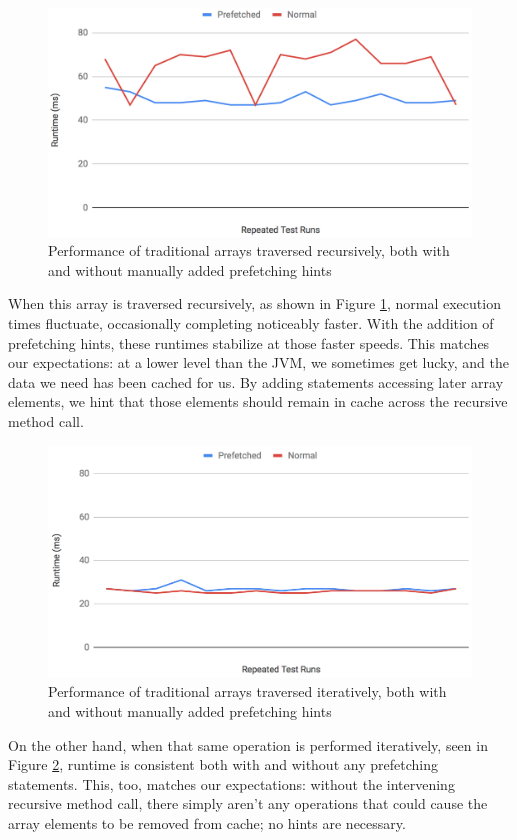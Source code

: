 \documentclass[journal]{IEEEtran}
\begin{document}
\begin{figure}[t]
    \includegraphics[width=0.9\linewidth]{arrayRecursive.png}
    \caption{\small Performance of traditional arrays traversed recursively, both with and without manually added prefetching hints}
    \label{fig:arrRecursive}
\end{figure}

When this array is traversed recursively, as shown in Figure \ref{fig:arrRecursive}, normal execution times fluctuate, occasionally completing noticeably faster. With the addition of prefetching hints, these runtimes stabilize at those faster speeds. This matches our expectations: at a lower level than the JVM, we sometimes get lucky, and the data we need has been cached for us. By adding statements accessing later array elements, we hint that those elements should remain in cache across the recursive method call.

\begin{figure}[t]
    \includegraphics[width=0.9\linewidth]{arrayIterative.png}
    \caption{\small Performance of traditional arrays traversed iteratively, both with and without manually added prefetching hints}
    \label{fig:arrIterative}
\end{figure}

On the other hand, when that same operation is performed iteratively, seen in Figure \ref{fig:arrIterative}, runtime is consistent both with and without any prefetching statements. This, too, matches our expectations: without the intervening recursive method call, there simply aren't any operations that could cause the array elements to be removed from cache; no hints are necessary.
\end{document}
